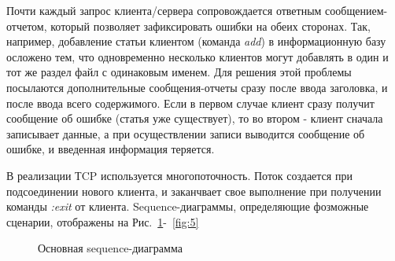 \documentclass[12pt,a4paper]{report}
\begin{document}
\hspace*{2em} Почти каждый запрос клиента/сервера сопровождается ответным сообщением-отчетом, который позволяет зафиксировать ошибки на обеих сторонах. Так, например, добавление статьи клиентом (команда \textit{add}) в информационную базу осложено тем, что одновременно несколько клиентов могут добавлять в один и тот же раздел файл с одинаковым именем. Для решения этой проблемы посылаются дополнительные сообщения-отчеты сразу после ввода заголовка, и после ввода всего содержимого. Если в первом случае клиент сразу получит сообщение об ошибке (статья уже существует), то во втором - клиент сначала записывает данные, а при осуществлении записи выводится сообщение об ошибке, и введенная информация теряется. 

В реализации ТCP используется многопоточность. Поток создается при подсоединении нового клиента, и заканчвает свое выполнение при получении команды \textit{:exit} от клиента.
Sequence-диаграммы, определяющие фозможные сценарии, отображены на Рис.~\ref{fig:1}-~\ref{fig:5}
\begin{figure}[H]
\caption{Основная sequence-диаграмма}
\label{fig:1}
\end{figure}
\end{document}
